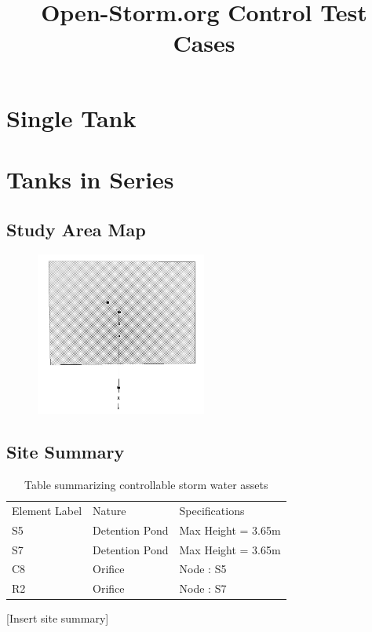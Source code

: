 \documentclass{article}
\title{Open-Storm.org Control Test Cases}
\begin{document}
\maketitle
\tableofcontents
\section{Single Tank}

\section{Tanks in Series}
\subsection{Study Area Map}

\begin{figure}[H]
  \centering
  \includegraphics[width = 0.5\textwidth]{series.JPG}
\end{figure}

\subsection{Site Summary}
\begin{table}[H]
\centering
\label{my-label}
\begin{tabular}{lll}
Element Label & Nature         & Specifications   \\
S5            & Detention Pond & Max Height = 3.65m  \\
  S7            & Detention Pond & Max Height = 3.65m \\
  C8 &Orifice & Node : S5\\
  R2 &Orifice & Node : S7\\
\end{tabular}
\caption{Table summarizing controllable storm water assets}
\end{table}
[Insert site summary]
\end{document}
